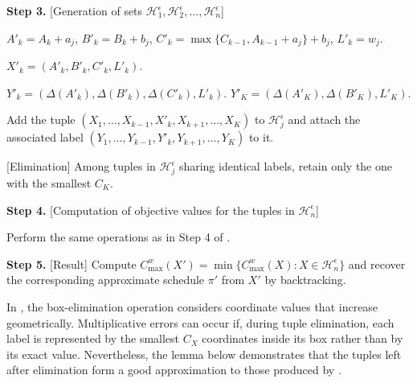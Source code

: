 \documentclass[12pt]{article} \textheight=24.5cm \textwidth=16.5cm \parskip = 0.165cm
\begin{document}
\begin{sloppypar}
\begin{algorithm}[H]
            \textbf{Step 3.} [Generation of sets $\mathcal{H}_1^{\epsilon}, \mathcal{H}_2^{\epsilon}, \ldots, \mathcal{H}_n^{\epsilon}$]
            
            {
                {
                    {
                        $A'_k = A_k+a_j$, $B'_k = B_k+b_j$, $C'_k = \max\{C_{k-1}, A_{k-1}+a_j\}+b_j$, $L'_k= w_j$. \;
                        
                        $X'_k=(A'_k, B'_k, C'_k, L'_k)$. \;
                        
                        {
                            $Y'_k=(\Delta(A'_k), \Delta(B'_k), \Delta(C'_k), L'_k)$. \;
                        }
                        {
                            $Y'_K=(\Delta(A'_K), \Delta(B'_K), L'_K)$. \;
                        }
                        
                        Add the tuple $(X_1, \ldots, X_{k-1}, X'_k, X_{k+1}, \ldots, X_K)$ to $\mathcal{H}_j^{\epsilon}$ and attach the associated label $(Y_1, \ldots, Y_{k-1}, Y'_k, Y_{k+1}, \ldots, Y_K)$ to it. \;
                    }
                }
                [Elimination] Among tuples in $\mathcal{H}_j^{\epsilon}$ sharing identical labels, retain only the one with the smallest $C_K$. \;
            }
            
            \textbf{Step 4.} [Computation of objective values for the tuples in $\mathcal{H}_n^{\epsilon}$]
            
            {
                Perform the same operations as in Step 4 of .
            }
            
            \textbf{Step 5.} [Result] Compute $C_{\max}^w(X')=\min \{C_{\max}^w(X): X \in \mathcal{H}_n^{\epsilon}\}$ and recover the corresponding approximate schedule $\pi'$ from $X'$ by backtracking. \;
            
        \end{algorithm}
        
        In , the box-elimination operation considers coordinate values that increase geometrically.
        Multiplicative errors can occur if, during tuple elimination, each label is represented by the smallest $C_X$ coordinates inside its box rather than by its exact value.
        Nevertheless, the lemma below demonstrates that the tuples left after elimination form a good approximation to those produced by .
        

\end{sloppypar}
\end{document}
